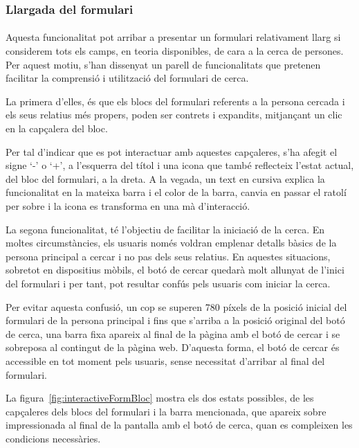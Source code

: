 \subsubsection{Llargada del formulari}

\paragraph{}
Aquesta funcionalitat pot arribar a presentar un formulari relativament llarg si considerem tots els camps, en teoria disponibles, de cara a la cerca de persones. Per aquest motiu, s'han dissenyat un parell de funcionalitats que pretenen facilitar la comprensió i utilització del formulari de cerca.

La primera d'elles, és que els blocs del formulari referents a la persona cercada i els seus relatius més propers, poden ser contrets i expandits, mitjançant un clic en la capçalera del bloc.

Per tal d'indicar que es pot interactuar amb aquestes capçaleres, s'ha afegit el signe `-' o `+', a l'esquerra del títol i una icona que també reflecteix l'estat actual, del bloc del formulari, a la dreta. A la vegada, un text en cursiva explica la funcionalitat en la mateixa barra i el color de la barra, canvia en passar el ratolí per sobre i la icona es transforma en una mà d'interacció.

La segona funcionalitat, té l'objectiu de facilitar la iniciació de la cerca. En moltes circumstàncies, els usuaris només voldran emplenar detalls bàsics de la persona principal a cercar i no pas dels seus relatius. En aquestes situacions, sobretot en dispositius mòbils, el botó de cercar quedarà molt allunyat de l'inici del formulari i per tant, pot resultar confús pels usuaris com iniciar la cerca.

Per evitar aquesta confusió, un cop se superen 780 píxels de la posició inicial del formulari de la persona principal i fins que s'arriba a la posició original del botó de cerca, una barra fixa apareix al final de la pàgina amb el botó de cercar i se sobreposa al contingut de la pàgina web. D'aquesta forma, el botó de cercar és accessible en tot moment pels usuaris, sense necessitat d'arribar al final del formulari.

La figura~\ref{fig:interactiveFormBloc} mostra els dos estats possibles, de les capçaleres dels blocs del formulari i la barra mencionada, que apareix sobre impressionada al final de la pantalla amb el botó de cerca, quan es compleixen les condicions necessàries.

